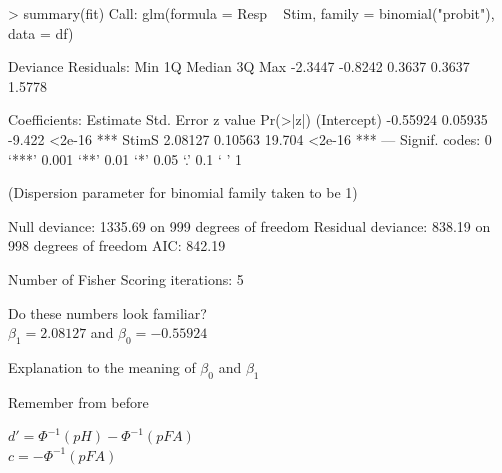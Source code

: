 \documentclass[10pt]{beamer}
\begin{document}
\begin{frame}[fragile]{}
\begin{verbnobox}[\small]
> summary(fit)
Call:
glm(formula = Resp ~ Stim, family = binomial("probit"), data = df)

Deviance Residuals: 
    Min       1Q   Median       3Q      Max  
-2.3447  -0.8242   0.3637   0.3637   1.5778  

Coefficients:
            Estimate Std. Error z value Pr(>|z|)    
(Intercept) -0.55924    0.05935  -9.422   <2e-16 ***
StimS        2.08127    0.10563  19.704   <2e-16 ***
---
Signif. codes:  0 ‘***’ 0.001 ‘**’ 0.01 ‘*’ 0.05 ‘.’ 0.1 ‘ ’ 1

(Dispersion parameter for binomial family taken to be 1)

    Null deviance: 1335.69  on 999  degrees of freedom
Residual deviance:  838.19  on 998  degrees of freedom
AIC: 842.19

Number of Fisher Scoring iterations: 5
\end{verbnobox}

\begin{center}
Do these numbers look familiar? \\
$\beta_1 = 2.08127$ and $\beta_0 = -0.55924 $
\end{center}
\end{frame}

\begin{frame}{Explanation to the meaning of $\beta_0$ and $\beta_1$}
\begin{block}{Remember from before}
\begin{center}
$d'= \Phi^{-1}(pH) - \Phi^{-1}(pFA)$ \\
$c = -\Phi^{-1}(pFA)$
\end{center}
\end{block}

\end{frame}
\end{document}
